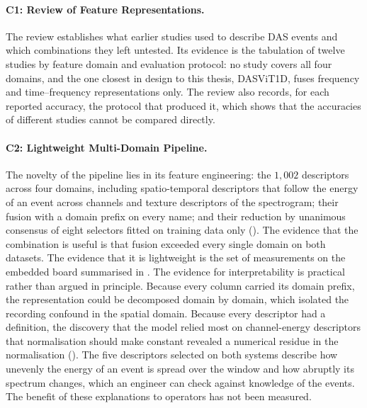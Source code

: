 \paragraph[C1: Review of Feature Representations]{C1: Review of Feature Representations.}
The review establishes what earlier studies used to describe DAS events and which combinations they left untested. Its evidence is the tabulation of twelve studies by feature domain and evaluation protocol: no study covers all four domains, and the one closest in design to this thesis, DASViT1D, fuses frequency and time--frequency representations only. The review also records, for each reported accuracy, the protocol that produced it, which shows that the accuracies of different studies cannot be compared directly.

\paragraph[C2: Lightweight Multi-Domain Pipeline]{C2: Lightweight Multi-Domain Pipeline.}
The novelty of the pipeline lies in its feature engineering: the $1{,}002$ descriptors across four domains, including spatio-temporal descriptors that follow the energy of an event across channels and texture descriptors of the spectrogram; their fusion with a domain prefix on every name; and their reduction by unanimous consensus of eight selectors fitted on training data only (). The evidence that the combination is useful is that fusion exceeded every single domain on both datasets. The evidence that it is lightweight is the set of measurements on the embedded board summarised in . The evidence for interpretability is practical rather than argued in principle. Because every column carried its domain prefix, the representation could be decomposed domain by domain, which isolated the recording confound in the spatial domain. Because every descriptor had a definition, the discovery that the model relied most on channel-energy descriptors that normalisation should make constant revealed a numerical residue in the normalisation (). The five descriptors selected on both systems describe how unevenly the energy of an event is spread over the window and how abruptly its spectrum changes, which an engineer can check against knowledge of the events. The benefit of these explanations to operators has not been measured.

